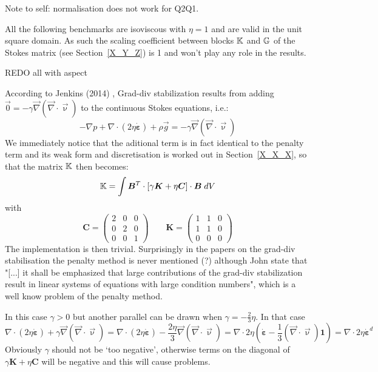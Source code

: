 
Note to self: normalisation does not work for Q2Q1.

All the following benchmarks are isoviscous with $\eta=1$ and are valid in the unit square domain. 
As such the scaling coefficient between blocks ${\mathbb{K}}$ and ${\mathbb{G}}$ of the Stokes matrix (see Section~\ref{X_Y_Z}) 
is 1 and won't play any role in the results. 

REDO all with aspect

According to Jenkins \etal (2014) \cite{jejl14}, Grad-div stabilization results from adding
$\vec{0} = - \gamma \vec\nabla (\vec\nabla\cdot \vec\upnu)$ to the continuous Stokes
equations, i.e.:
\[
-\nabla p  + \nabla \cdot ( 2 \eta \dot{\bm \varepsilon}) + \rho \vec{g} 
= - \gamma \vec\nabla (\vec\nabla\cdot \vec\upnu)
\]
We immediately notice that the aditional term is in fact identical to the penalty term and 
its weak form and discretisation is worked out in Section~\ref{X_X_X}, so that 
the matrix ${\mathbb{K}}$ then becomes:
\[
{\mathbb{K}} = \int {\bm B}^T \cdot [ \gamma {\bm K} + \eta {\bm C} ] \cdot {\bm B} \; dV
\]
with 
\[
{\bm C}=
\left(
\begin{array}{ccc}
2 & 0 & 0 \\
0 & 2 & 0 \\
0 & 0 & 1 
\end{array}
\right)
\qquad
{\bm K}=
\left(
\begin{array}{ccc}
1 & 1 & 0 \\
1 & 1 & 0 \\
0 & 0 & 0 
\end{array}
\right)
\]
The implementation is then trivial. Surprisingly in the papers on the grad-div stabilisation 
the penalty method is never mentioned (?) although John \etal state that 
"[...] it shall be emphasized that large
contributions of the grad-div stabilization result in linear systems of equations with
large condition numbers", which is a well know problem of the penalty method.

In this case $\gamma>0$ but another parallel can be drawn when $\gamma = -\frac{2}{3}\eta$. In that case
\[
 \nabla \cdot ( 2 \eta \dot{\bm \varepsilon}) + \gamma \vec\nabla (\vec\nabla\cdot \vec\upnu)
=
 \nabla \cdot ( 2 \eta \dot{\bm \varepsilon}) -\frac{2\eta}{3} \vec\nabla (\vec\nabla\cdot \vec\upnu)
=
 \nabla \cdot 2 \eta ( \dot{\bm \varepsilon} -\frac{1}{3} (\vec\nabla\cdot \vec\upnu) {\bm 1} )
= 
 \nabla \cdot 2 \eta \dot{\bm \varepsilon}^d 
\]
Obviously $\gamma$ should not be `too negative', otherwise terms on the diagonal 
of $\gamma {\bm K} + \eta {\bm C} $
will be negative and this will cause problems. 

